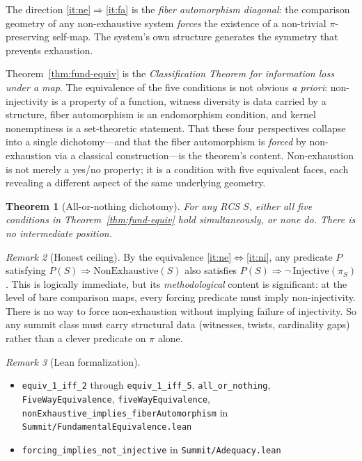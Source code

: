 \documentclass[11pt,a4paper]{article}
\theoremstyle{plain}
\newtheorem{theorem}{Theorem}[section]
\theoremstyle{definition}
\theoremstyle{remark}
\newtheorem{remark}[theorem]{Remark}
\newcommand{\compare}{\pi}
\begin{document}
The direction \ref{it:ne}$\Rightarrow$\ref{it:fa} is the \emph{fiber automorphism
diagonal}: the comparison geometry of any non-exhaustive system \emph{forces}
the existence of a non-trivial $\compare$-preserving self-map. The system's own
structure generates the symmetry that prevents exhaustion.

Theorem~\ref{thm:fund-equiv} is the \emph{Classification Theorem for
information loss under a map}. The equivalence of the five conditions is not
obvious \emph{a priori}: non-injectivity is a property of a function,
witness diversity is data carried by a structure, fiber automorphism is
an endomorphism condition, and kernel nonemptiness is a set-theoretic
statement. That these four perspectives collapse into a single
dichotomy---and that the fiber automorphism is \emph{forced} by
non-exhaustion via a classical construction---is the theorem's content.
Non-exhaustion is not merely a yes/no property; it is a condition with
five equivalent faces, each revealing a different aspect of the same
underlying geometry.

\begin{theorem}[All-or-nothing dichotomy]\label{thm:all-or-nothing}
For any RCS $S$, either all five conditions in
Theorem~\ref{thm:fund-equiv} hold simultaneously, or none do.
There is no intermediate position.
\end{theorem}

\begin{remark}[Honest ceiling]\label{rem:meta}
By the equivalence \ref{it:ne}$\Leftrightarrow$\ref{it:ni}, any predicate
$P$ satisfying $P(S) \Rightarrow \text{NonExhaustive}(S)$ also satisfies
$P(S) \Rightarrow \lnot\,\text{Injective}(\compare_S)$. This is logically
immediate, but its \emph{methodological} content is significant: at the level
of bare comparison maps, every forcing predicate must imply non-injectivity.
There is no way to force non-exhaustion without implying failure of
injectivity. So any summit class must carry structural data (witnesses,
twists, cardinality gaps) rather than a clever predicate on $\compare$ alone.
\end{remark}

\begin{remark}[Lean formalization]\label{rem:lean-equiv}
\leavevmode\par\begin{itemize}[nosep,leftmargin=*,before=\raggedright]
\item \texttt{equiv\_1\_iff\_2} through \texttt{equiv\_1\_iff\_5}, \texttt{all\_or\_nothing}, \texttt{FiveWayEquivalence}, \texttt{fiveWayEquivalence}, \texttt{nonExhaustive\_implies\_\allowbreak{}fiberAutomorphism} in \texttt{Summit/FundamentalEquivalence.lean}
\item \texttt{forcing\_implies\_not\_injective} in \texttt{Summit/Adequacy.lean}
\end{itemize}
\end{remark}
\end{document}
